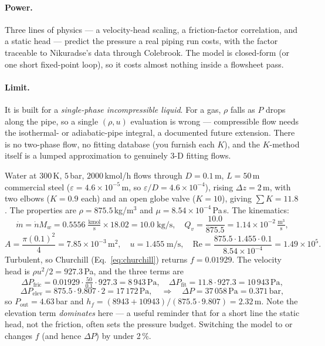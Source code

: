 \documentclass[11pt,a4paper]{article}
\begin{document}
\paragraph{Power.}  Three lines of physics --- a velocity-head scaling, a
friction-factor correlation, and a static head --- predict the pressure a
real piping run costs, with the factor traceable to Nikuradse's data
through Colebrook.  The model is closed-form (or one short fixed-point
loop), so it costs almost nothing inside a flowsheet pass.

\paragraph{Limit.}  It is built for a \emph{single-phase incompressible
liquid}.  For a gas, $\rho$ falls as $P$ drops along the pipe, so a single
$(\rho,u)$ evaluation is wrong --- compressible flow needs the
isothermal- or adiabatic-pipe integral, a documented future extension.
There is no two-phase flow, no fitting database (you furnish each $K$), and
the $K$-method itself is a lumped approximation to genuinely 3-D fitting
flows.

\begin{example}
Water at $300$\,K, $5$\,bar, $2000$\,kmol/h flows through $D=0.1$\,m,
$L=50$\,m commercial steel ($\varepsilon = 4.6\times10^{-5}$\,m, so
$\varepsilon/D = 4.6\times10^{-4}$), rising $\Delta z = 2$\,m, with two
elbows ($K=0.9$ each) and an open globe valve ($K=10$), giving $\sum K =
11.8$.  The properties are $\rho = 875.5$\,kg/m$^3$ and $\mu =
8.54\times10^{-4}$\,Pa\,s.  The kinematics:
\[
   \dot m = \dot n M_w = 0.5556\;\tfrac{\text{kmol}}{\text{s}}\times18.02
   = 10.0\;\text{kg/s},\quad
   Q_v = \frac{10.0}{875.5}=1.14\times10^{-2}\,\tfrac{\text{m}^3}{\text{s}},
\]
\[
   A = \frac{\pi(0.1)^2}{4}=7.85\times10^{-3}\,\text{m}^2,\quad
   u = 1.455\;\text{m/s},\quad
   \mathrm{Re} = \frac{875.5\cdot1.455\cdot0.1}{8.54\times10^{-4}}
        = 1.49\times10^{5}.
\]
Turbulent, so Churchill (Eq.~\ref{eq:churchill}) returns $f = 0.01929$.
The velocity head is $\rho u^2/2 = 927.3$\,Pa, and the three terms are
\[
   \Delta P_{\text{fric}} = 0.01929\cdot\tfrac{50}{0.1}\cdot927.3
   = 8\,943\,\text{Pa},\quad
   \Delta P_{\text{fit}} = 11.8\cdot927.3 = 10\,943\,\text{Pa},
\]
\[
   \Delta P_{\text{elev}} = 875.5\cdot9.807\cdot2 = 17\,172\,\text{Pa},
   \quad\Rightarrow\quad
   \Delta P = 37\,058\,\text{Pa} = 0.371\,\text{bar},
\]
so $P_{\text{out}} = 4.63$\,bar and $h_f = (8943+10943)/(875.5\cdot9.807)
= 2.32$\,m.  Note the elevation term \emph{dominates} here --- a useful
reminder that for a short line the static head, not the friction, often
sets the pressure budget.  Switching the model to  or
 changes $f$ (and hence $\Delta P$) by under 2\,\%.
\end{example}
\end{document}
